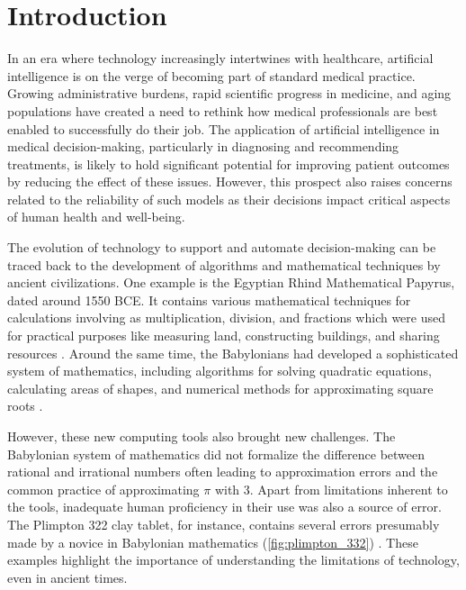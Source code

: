 
\chapter[introduction]{Introduction}\label{chp:introduction}


In an era where technology increasingly intertwines with healthcare, artificial intelligence is on the verge of becoming part of standard medical practice. 
Growing administrative burdens, rapid scientific progress in medicine, and aging populations have created a need to rethink how medical professionals are best enabled to successfully do their job. 
The application of artificial intelligence in medical decision-making, particularly in diagnosing and recommending treatments, is likely to hold significant potential for improving patient outcomes by reducing the effect of these issues. 
However, this prospect also raises concerns related to the reliability of such models as their decisions impact critical aspects of human health and well-being.

The evolution of technology to support and automate decision-making can be traced back to the development of algorithms and mathematical techniques by ancient civilizations. 
One example is the Egyptian Rhind Mathematical Papyrus, dated around 1550 BCE. It contains various mathematical techniques for calculations involving as multiplication, division, and fractions which were used for practical purposes like measuring land, constructing buildings, and sharing resources \cite{georges_universal_2001}. 
Around the same time, the Babylonians had developed a sophisticated system of mathematics, including algorithms for solving quadratic equations, calculating areas of shapes, and numerical methods for approximating square roots \cite{fowler_square_1998}. 

However, these new computing tools also brought new challenges. The Babylonian system of mathematics did not formalize the difference between rational and irrational numbers often leading to approximation errors and the common practice of approximating $\pi$ with 3. Apart from limitations inherent to the tools, inadequate human proficiency in their use was also a source of error. The Plimpton 322 clay tablet, for instance, contains several errors presumably made by a novice in Babylonian mathematics (\cref{fig:plimpton_332}) \cite{britton_plimpton_2011}.
These examples highlight the importance of understanding the limitations of technology, even in ancient times.

